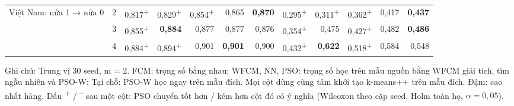 \begin{table}[htbp]
\begin{tabular}{@{}llrrrrrrrrrr@{}}
\midrule
Việt Nam: nửa 1 → nửa 0 & 2 & 0,817\textsuperscript{+} & 0,829\textsuperscript{+} & 0,854\textsuperscript{+} & 0,865 & \textbf{0,870} & 0,295\textsuperscript{+} & 0,311\textsuperscript{+} & 0,362\textsuperscript{+} & 0,417 & \textbf{0,437} \\
 & 3 & 0,855\textsuperscript{+} & \textbf{0,884} & 0,877 & 0,877 & 0,876 & 0,354\textsuperscript{+} & 0,475 & 0,427\textsuperscript{+} & 0,482 & \textbf{0,486} \\
 & 4 & 0,884\textsuperscript{+} & 0,894\textsuperscript{+} & 0,901 & \textbf{0,901} & 0,900 & 0,432\textsuperscript{+} & \textbf{0,622} & 0,518\textsuperscript{+} & 0,584 & 0,548 \\
\bottomrule
\end{tabular}
\par\smallskip\parbox{\linewidth}{\scriptsize Ghi chú: Trung vị 30 seed, m = 2. FCM: trọng số bằng nhau; WFCM, NN, PSO: trọng số học trên mẫu nguồn bằng WFCM giải tích, tìm ngẫu nhiên và PSO-W; Tại chỗ: PSO-W học ngay trên mẫu đích. Mọi cột dùng cùng tâm khởi tạo k-means++ trên mẫu đích. Đậm: cao nhất hàng. Dấu \textsuperscript{+} / \textsuperscript{--} sau một cột: PSO chuyển tốt hơn / kém hơn cột đó có ý nghĩa (Wilcoxon theo cặp seed, Holm toàn họ, $\alpha = 0{,}05$).}
\end{table}
